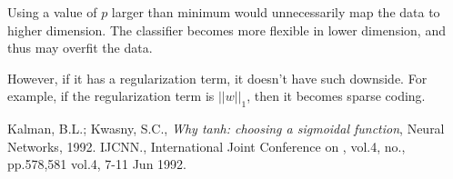 \documentclass[10pt]{article}
\begin{document}
\hfill

Using a value of $p$ larger than minimum would unnecessarily map the
data to higher dimension. The classifier becomes more flexible in
lower dimension, and thus may overfit the data.

However, if it has a regularization term, it doesn't have such
downside. For example, if the regularization term is $||w||_1$, then
it becomes sparse coding.

\begin{thebibliography}{1}

 Kalman, B.L.; Kwasny, S.C., {\em Why tanh: choosing a
sigmoidal function}, Neural Networks, 1992. IJCNN., International
Joint Conference on , vol.4, no., pp.578,581 vol.4, 7-11 Jun 1992.

\end{thebibliography}
\end{document}
